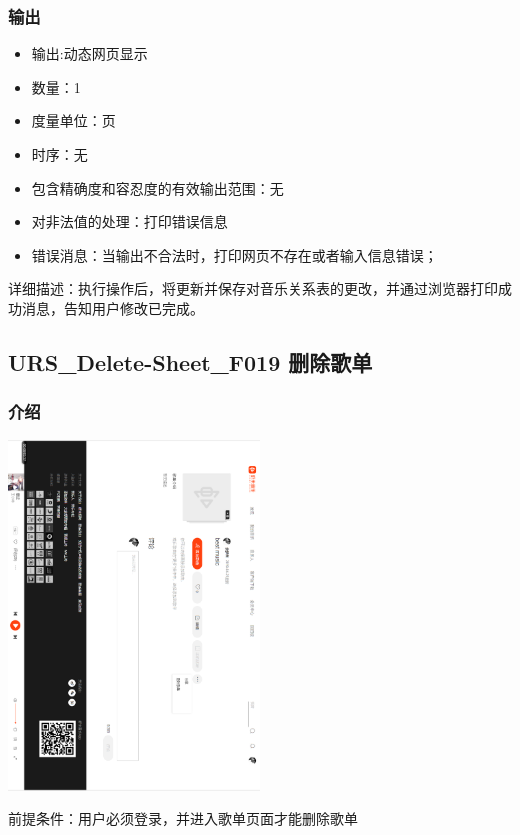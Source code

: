 				  \subsubsection{输出}
				  \begin{itemize}
					  \item	输出:动态网页显示
					  \item	数量：1
					  \item	度量单位：页
					  \item	时序：无
					  \item	包含精确度和容忍度的有效输出范围：无
					  \item	对非法值的处理：打印错误信息
					  \item	错误消息：当输出不合法时，打印网页不存在或者输入信息错误；
					 \end{itemize}
					 详细描述：执行操作后，将更新并保存对音乐关系表的更改，并通过浏览器打印成功消息，告知用户修改已完成。




			
					 \subsection{URS\_Delete-Sheet\_F019 删除歌单}
				  \subsubsection{介绍}
				  
				  \begin{center}
					\begin{sideways} 
				   \includegraphics[width=0.5\textwidth]{./figures/capture20.png} 
					\end{sideways}

				\end{center}
				  前提条件：用户必须登录，并进入歌单页面才能删除歌单
			   
